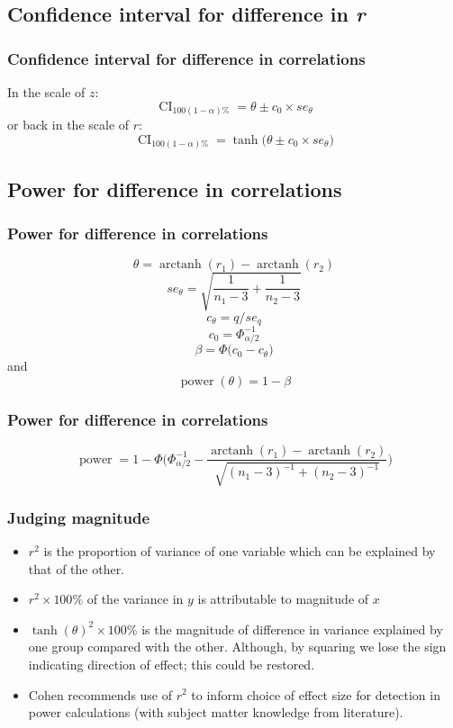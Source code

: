 \documentclass{beamer}
\DeclareMathOperator\arctanh{arctanh}
\DeclareMathOperator\ci{CI}
\DeclareMathOperator\power{power}
\begin{document}
  \subsection{Confidence interval for difference in \it{r}}   
  \begin{frame}
    \frametitle{Confidence interval for difference in correlations}  
    In the scale of \(z\):
    \[\ci_{100(1-\alpha)\%} =\theta \pm c_0 \times se_\theta \] 
    or back in the scale of \(r\):
    \[\ci_{100(1-\alpha)\%} =\tanh \bigg( \theta \pm c_0 \times se_\theta \bigg) \] 
  \end{frame}    
  
  \subsection{Power for difference in correlations}   
  \begin{frame}
    \frametitle{Power for difference in correlations }  
    \[\theta     = \arctanh(r_1) - \arctanh(r_2)            \]
    \[se_\theta    = \sqrt{\frac{1}{n_1-3}+\frac{1}{n_2-3}} \]
    \[c_\theta     = q / se_q                               \] 
    \[c_0   =  \Phi_{\alpha/2}^{-1}                         \]
    \[\beta = \Phi \bigg( c_0 - c_\theta \bigg)             \]
    and
    \[ \power(\theta) = 1 - \beta                           \]
  \end{frame}
  
  \begin{frame}
    \frametitle{Power for difference in correlations}  
    \[ \power = 1- \Phi \bigg(\Phi_{\alpha/2}^{-1} - \frac{\arctanh(r_1) - \arctanh(r_2)}{\sqrt{(n_1-3)^{-1} + (n_2-3)^{-1}}} \bigg) \]
  \end{frame}

  \begin{frame}
    \frametitle{Judging magnitude}  
      \begin{itemize}         
				\item \(r^2\) is the proportion of variance of one variable which can be explained by that of the other.
	      \item \(r^2 \times 100\%\) of the variance in \(y\) is attributable to magnitude of \(x\)    
 	      \item \(\tanh(\theta)^2 \times 100\%\) is the magnitude of difference in variance explained by one group compared with the other.  Although, by squaring we lose the sign indicating direction of effect; this could be restored.
        \item Cohen  recommends use of \(r^2\) to inform choice of effect size for detection in power calculations (with subject matter knowledge from literature).
      \end{itemize}
  \end{frame}
  
\end{document}
